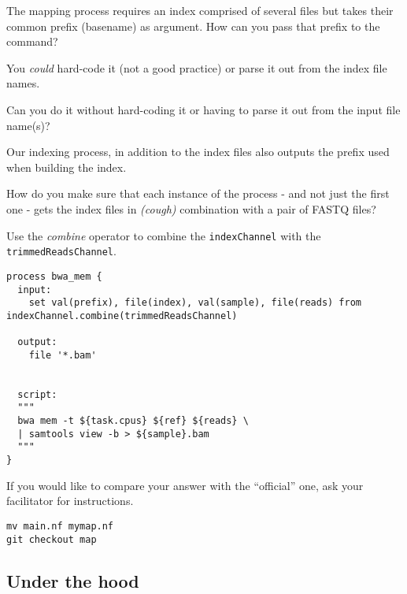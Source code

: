 \begin{questions}

The mapping process requires an index comprised of several files but takes their common prefix (basename) 
as argument. How can you pass that prefix to the command?\\

\begin{answer}
You \emph{could} hard-code it (not a good practice) or parse it out from the index file names. 
\end{answer}

Can you do it without hard-coding it or having to parse it out from the input file name(s)?\\

\begin{answer}
Our indexing process, in addition to the index files also outputs the prefix used when building the index. \\
\end{answer}

How do you make sure that each instance of the process - and not just the first one - gets the index files in \emph{(cough)} combination with a pair of FASTQ files?\\

\begin{answer}
Use the \emph{combine} operator to combine the \texttt{indexChannel} with the \texttt{trimmedReadsChannel}.

\begin{lstlisting}
process bwa_mem {
  input:
    set val(prefix), file(index), val(sample), file(reads) from indexChannel.combine(trimmedReadsChannel)

  output:
    file '*.bam'

    
  script:
  """
  bwa mem -t ${task.cpus} ${ref} ${reads} \
  | samtools view -b > ${sample}.bam
  """
}
\end{lstlisting}
\end{answer}


If you would like to compare your answer with the ``official'' one, ask your facilitator for instructions. 
\begin{answer}
\begin{lstlisting}
mv main.nf mymap.nf
git checkout map
\end{lstlisting}
\end{answer}
\end{questions}



\subsection{Under the hood}

